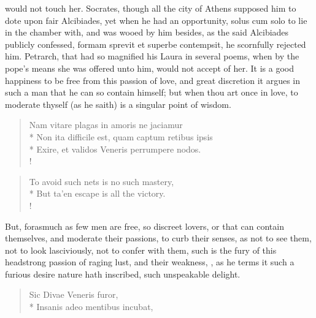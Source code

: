would not touch her. Socrates, though all the city of Athens supposed
him to dote upon fair Alcibiades, yet when he had an opportunity,
solus cum solo to lie in the chamber with, and was wooed by him
besides, as the said Alcibiades publicly confessed, formam
sprevit et superbe contempsit, he scornfully rejected him. Petrarch,
that had so magnified his Laura in several poems, when by the pope's
means she was offered unto him, would not accept of her. It is a
good happiness to be free from this passion of love, and great
discretion it argues in such a man that he can so contain himself; but
when thou art once in love, to moderate thyself (as he saith) is a
singular point of wisdom.
%
\begin{latin}%
\begin{verse}%
Nam vitare plagas in amoris ne jaciamur\\*
Non ita difficile est, quam captum retibus ipsis\\*
Exire, et validos Veneris perrumpere nodos.\\!
\end{verse}%
\end{latin}%
\translationrule%
\begin{verse}%
To avoid such nets is no such mastery,\\*
But ta'en escape is all the victory.\\!
\end{verse}%
%

But, forasmuch as few men are free, so discreet lovers, or that can
contain themselves, and moderate their passions, to curb their senses,
as not to see them, not to look lasciviously, not to confer with them,
such is the fury of this headstrong passion of raging lust, and their
weakness, , as he terms it such
a furious desire nature hath inscribed, such unspeakable delight.

\begin{latin}%
\begin{verse}%
Sic Divae Veneris furor,\\*
Insanis adeo mentibus incubat,
\end{verse}%
\end{latin}%

